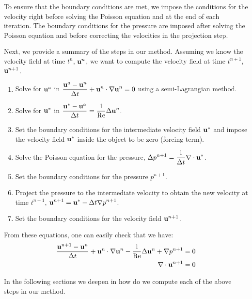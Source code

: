 To ensure that the boundary conditions are met, we impose the conditions for the velocity right before solving the Poisson equation and at the end of each iteration. The boundary conditions for the pressure are imposed after solving the Poisson equation and before correcting the velocities in the projection step.

Next, we provide a summary of the steps in our method. Assuming we know the velocity field at time $t^n$, $\boldsymbol{\mathrm{u}}^n$, we want to compute the velocity field at time $t^{n+1}$, $\boldsymbol{\mathrm{u}}^{n+1}$.
\begin{enumerate}
  \item Solve for $\boldsymbol{\mathrm{u}}^a$ in $\displaystyle  \frac{\boldsymbol{\mathrm{u}}^a-\boldsymbol{\mathrm{u}}^n}{\Delta t} + \boldsymbol{\mathrm{u}}^n \cdot \nabla \boldsymbol{\mathrm{u}}^n = 0$ using a semi-Lagrangian method.
  \item Solve for $\boldsymbol{\mathrm{u}}^*$ in $\displaystyle  \frac{\boldsymbol{\mathrm{u}}^* - \boldsymbol{\mathrm{u}}^a}{\Delta t} = \frac{1}{\mathrm{Re}} \Delta \boldsymbol{\mathrm{u}}^n$.
  \item Set the boundary conditions for the intermediate velocity field $\boldsymbol{\mathrm{u}}^*$ and impose the velocity field $\boldsymbol{\mathrm{u}}^*$ inside the object to be zero (forcing term).
  \item Solve the Poisson equation for the pressure, $\displaystyle \Delta p^{n+1} = \frac{1}{\Delta t}\nabla \cdot \boldsymbol{\mathrm{u}}^*$.
  \item Set the boundary conditions for the pressure $p^{n+1}$.
  \item Project the pressure to the intermediate velocity to obtain the new velocity at time $t^{n+1}$, $\displaystyle \boldsymbol{\mathrm{u}}^{n+1} = \boldsymbol{\mathrm{u}}^* - \Delta t\nabla p^{n+1}$.
  \item Set the boundary conditions for the velocity field $\boldsymbol{\mathrm{u}}^{n+1}$.
\end{enumerate}
From these equations, one can easily check that we have:
\begin{align*}
  \frac{\boldsymbol{\mathrm{u}}^{n+1}-\boldsymbol{\mathrm{u}}^n}{\Delta t} + \boldsymbol{\mathrm{u}}^n \cdot \nabla \boldsymbol{\mathrm{u}}^n - \frac{1}{\mathrm{Re}} \Delta \boldsymbol{\mathrm{u}}^n + \nabla p^{n+1} & = 0 \\
  \nabla \cdot \boldsymbol{\mathrm{u}}^{n+1}                                                                                                   & = 0
\end{align*}

In the following sections we deepen in how do we compute each of the above steps in our method.

